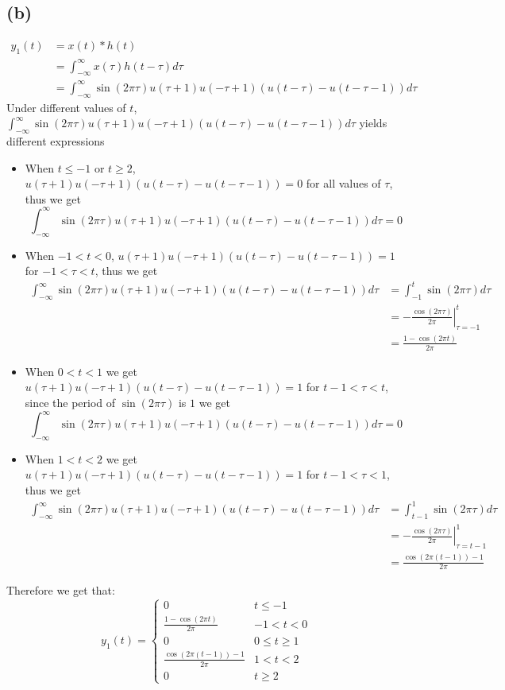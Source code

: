 \documentclass[12pt]{article}
\begin{document}
\subsection*{(b)}
\begin{align*}
y_1(t)&=x(t)*h(t)\\
&=\int_{-\infty}^{\infty}x(\tau)h(t-\tau)d\tau\\
&=\int_{-\infty}^{\infty}\sin(2\pi\tau)u(\tau+1)u(-\tau+1)\left(u(t-\tau)-u(t-\tau-1)\right)d\tau
\end{align*}
Under different values of $t$, $\int_{-\infty}^{\infty}\sin(2\pi\tau)u(\tau+1)u(-\tau+1)\left(u(t-\tau)-u(t-\tau-1)\right)d\tau$ yields different expressions
\begin{itemize}
\item When $t\leq-1$ or $t\geq2$, $u(\tau+1)u(-\tau+1)\left(u(t-\tau)-u(t-\tau-1)\right)=0$ for all values of $\tau$, thus we get
$$\int_{-\infty}^{\infty}\sin(2\pi\tau)u(\tau+1)u(-\tau+1)\left(u(t-\tau)-u(t-\tau-1)\right)d\tau=0$$
\item When $-1<t<0$, $u(\tau+1)u(-\tau+1)\left(u(t-\tau)-u(t-\tau-1)\right)=1$ for $-1<\tau<t$, thus we get
\begin{align*}
\int_{-\infty}^{\infty}\sin(2\pi\tau)u(\tau+1)u(-\tau+1)\left(u(t-\tau)-u(t-\tau-1)\right)d\tau&=\int_{-1}^{t}\sin(2\pi\tau)d\tau\\
&=\left.-\frac{\cos(2\pi\tau)}{2\pi}\right|_{\tau=-1}^{t}\\
&=\frac{1-\cos(2\pi t)}{2\pi}
\end{align*}
\item When $0<t<1$ we get $u(\tau+1)u(-\tau+1)\left(u(t-\tau)-u(t-\tau-1)\right)=1$ for $t-1<\tau<t$, since the period of $\sin(2\pi\tau)$ is $1$ we get
$$\int_{-\infty}^{\infty}\sin(2\pi\tau)u(\tau+1)u(-\tau+1)\left(u(t-\tau)-u(t-\tau-1)\right)d\tau=0$$
\item When $1<t<2$ we get $u(\tau+1)u(-\tau+1)\left(u(t-\tau)-u(t-\tau-1)\right)=1$ for $t-1<\tau<1$, thus we get
\begin{align*}
\int_{-\infty}^{\infty}\sin(2\pi\tau)u(\tau+1)u(-\tau+1)\left(u(t-\tau)-u(t-\tau-1)\right)d\tau&=\int_{t-1}^{1}\sin(2\pi\tau)d\tau\\
&=\left.-\frac{\cos(2\pi\tau)}{2\pi}\right|_{\tau=t-1}^{1}\\
&=\frac{\cos(2\pi(t-1))-1}{2\pi}
\end{align*}
\end{itemize}
Therefore we get that:
$$y_1(t)=\boxed{\begin{cases}
0 & t\leq-1\\
\frac{1-\cos(2\pi t)}{2\pi} & -1<t<0\\
0 &  0\leq t\geq1\\
\frac{\cos(2\pi(t-1))-1}{2\pi} & 1<t<2\\
0 & t\geq2
\end{cases}}$$
\end{document}
